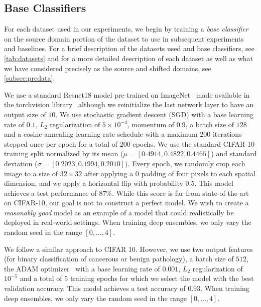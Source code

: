 \subsection{Base Classifiers}
\label{subsec:basclf}
For each dataset used in our experiments, we begin by training a \textit{base classifier} on the source domain portion of the dataset to use in subsequent experiments and baselines.
For a brief description of the datasets used and base classifiers, see \autoref{tab:datasets} and for a more detailed description of each dataset as well as what we have considered precisely as the source and shifted domains, see \autoref{subsec:predata}.

\smallbreak
{}
We use a standard Resnet18 model pre-trained on ImageNet~\citep{deng2009imagenet} made available in the torchvision library~\citep{torchvision} although we reinitialize the last network layer to have an output size of $10$.
We use stochastic gradient descent (SGD) with a base learning rate of $0.1$, $L_2$ regularization of $5\times 10^{-4}$, momentum of $0.9$, a batch size of $128$ and a cosine annealing learning rate schedule with a maximum 200 iterations stepped once per epoch for a total of 200 epochs.
We use the standard CIFAR-10 training split normalized by its mean ($\mu=[0.4914, 0.4822, 0.4465]$) and standard deviation ($\sigma=[0.2023, 0.1994, 0.2010])$.
Every epoch, we randomly crop each image to a size of $32\times 32$ after applying a $0$ padding of four pixels to each spatial dimension, and we apply a horizontal flip with probability $0.5$.
This model achieves a test performance of $87\%$.
While this score is far from state-of-the-art on CIFAR-10, our goal is not to construct a perfect model.
We wish to create a \textit{reasonably good} model as an example of a model that could realistically be deployed in real-world settings.
When training deep ensembles, we only vary the random seed in the range $[0,\ldots ,4]$.

\smallbreak
{}
We follow a similar approach to CIFAR 10.
However, we use two output features (for binary classification of cancerous or benign pathology), a batch size of $512$, the ADAM optimizer~\citep{DBLP:journals/corr/KingmaB14} with a base learning rate of $0.001$, $L_2$ regularization of $10^{-5}$ and a total of $5$ training epochs for which we select the model with the best validation accuracy.
This model achieves a test accuracy of $0.93$.
When training deep ensembles, we only vary the random seed in the range $[0,\dots,4]$.


